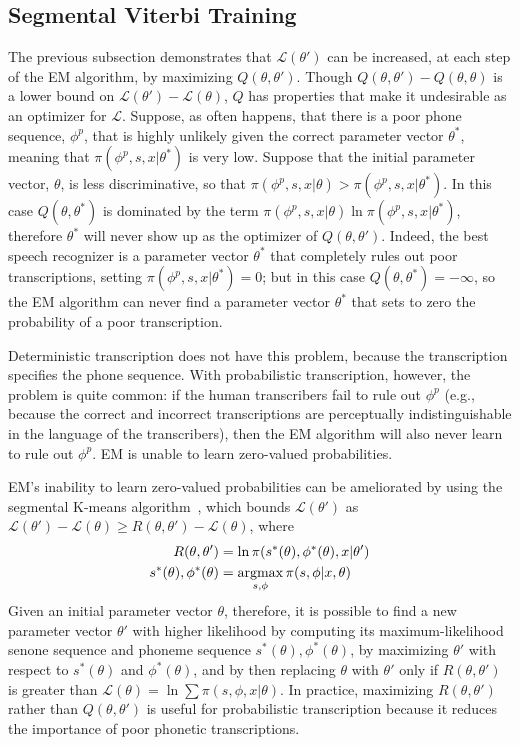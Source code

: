 \subsection{Segmental Viterbi Training}

The previous subsection demonstrates that ${\mathcal L}(\theta')$ can
be increased, at each step of the EM algorithm, by maximizing
$Q(\theta,\theta')$.  Though $Q(\theta,\theta')-Q(\theta,\theta)$ is a
lower bound on ${\mathcal L}(\theta')-{\mathcal L}(\theta)$, $Q$
has properties that make it undesirable as an optimizer for ${\mathcal
  L}$.  Suppose, as often happens, that there is a poor phone
sequence, $\phi^p$, that is highly unlikely given the correct
parameter vector $\theta^*$, meaning that $\pi(\phi^p,s,x|\theta^*)$
is very low.  Suppose that the initial parameter vector, $\theta$, is
less discriminative, so that
$\pi(\phi^p,s,x|\theta)>\pi(\phi^p,s,x|\theta^*)$.  In this case
$Q(\theta,\theta^*)$ is dominated by the term
$\pi(\phi^p,s,x|\theta)\ln\pi(\phi^p,s,x|\theta^*)$, therefore
$\theta^*$ will never show up as the optimizer of $Q(\theta,\theta')$.
Indeed, the best speech recognizer is a parameter vector $\theta^*$
that completely rules out poor transcriptions, setting
$\pi(\phi^p,s,x|\theta^*)=0$; but in this case
$Q(\theta,\theta^*)=-\infty$, so the EM algorithm can never find a
parameter vector $\theta^*$ that sets to zero the probability of a
poor transcription.

Deterministic transcription does not have this problem, because the
transcription specifies the phone sequence.  With probabilistic
transcription, however, the problem is quite common: if the
human transcribers fail to rule out $\phi^p$ (e.g., because the
correct and incorrect transcriptions are perceptually
indistinguishable in the language of the transcribers), then the EM
algorithm will also never learn to rule out $\phi^p$.  EM is unable
to learn zero-valued probabilities.

EM's inability to learn zero-valued probabilities can be ameliorated
by using the segmental K-means algorithm~\cite{Juang1990}, which
bounds ${\mathcal L}(\theta')$ as
$\mathcal{L}(\theta')-\mathcal{L}(\theta)\ge
R(\theta,\theta')-\mathcal{L}(\theta)$, where
\begin{align}
  R(\theta,\theta') &= \ln \pi(s^*(\theta),\phi^*(\theta),x|\theta')\\
  s^*(\theta),\phi^*(\theta)&= \operatorname*{argmax}_{s,\phi} \pi(s,\phi|x,\theta)
\end{align}
Given an initial parameter vector $\theta$, therefore, it is possible
to find a new parameter vector $\theta'$ with higher likelihood by
computing its maximum-likelihood senone sequence and phoneme sequence
$s^*(\theta),\phi^*(\theta)$, by maximizing $\theta'$ with respect to
$s^*(\theta)$ and $\phi^*(\theta)$, and by then replacing $\theta$
with $\theta'$ only if $R(\theta,\theta')$ is greater than ${\mathcal
  L}(\theta)=\ln \sum\pi(s,\phi,x|\theta)$.  In practice, maximizing
$R(\theta,\theta')$ rather than $Q(\theta,\theta')$ is useful for
probabilistic transcription because it reduces the importance of poor
phonetic transcriptions.
